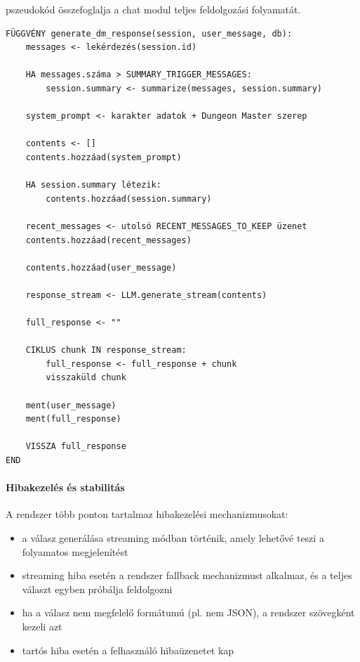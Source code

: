 \documentclass[
]{thesis-ekf}
\theoremstyle{definition}
\theoremstyle{remark}
\begin{document}
 pszeudokód összefoglalja a chat modul teljes feldolgozási folyamatát.

\begin{lstlisting}[style=pseudostyle, caption={Chat üzenet feldolgozási folyamat}, label={code_chat_flow}]
FÜGGVÉNY generate_dm_response(session, user_message, db):
    messages <- lekérdezés(session.id)
    
    HA messages.száma > SUMMARY_TRIGGER_MESSAGES:
        session.summary <- summarize(messages, session.summary)

    system_prompt <- karakter adatok + Dungeon Master szerep

    contents <- []
    contents.hozzáad(system_prompt)

    HA session.summary létezik:
        contents.hozzáad(session.summary)

    recent_messages <- utolsó RECENT_MESSAGES_TO_KEEP üzenet
    contents.hozzáad(recent_messages)

    contents.hozzáad(user_message)

    response_stream <- LLM.generate_stream(contents)

    full_response <- ""

    CIKLUS chunk IN response_stream:
        full_response <- full_response + chunk
        visszaküld chunk

    ment(user_message)
    ment(full_response)

    VISSZA full_response
END
\end{lstlisting}

\paragraph{Hibakezelés és stabilitás}

A rendszer több ponton tartalmaz hibakezelési mechanizmusokat:

\begin{itemize}
    \item a válasz generálása streaming módban történik, amely lehetővé teszi a folyamatos megjelenítést
    \item streaming hiba esetén a rendszer fallback mechanizmust alkalmaz, és a teljes választ egyben próbálja feldolgozni
    \item ha a válasz nem megfelelő formátumú (pl. nem JSON), a rendszer szövegként kezeli azt
    \item tartós hiba esetén a felhasználó hibaüzenetet kap
\end{itemize}
\end{document}
